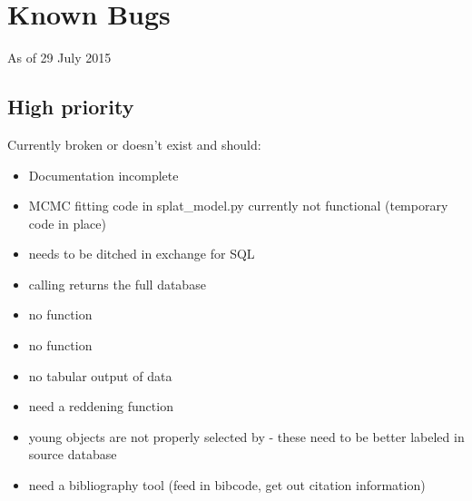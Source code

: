 \documentclass[letterpaper,10pt,english]{sphinxmanual}
\begin{document}
\section{Known Bugs}
\label{bugs:known-bugs}\label{bugs::doc}
As of 29 July 2015


\subsection{High priority}
\label{bugs:high-priority}
Currently broken or doesn't exist and should:
\begin{itemize}
\item {} 
Documentation incomplete

\item {} 
MCMC fitting code in splat\_model.py currently not functional (temporary code in place)

\item {} 
 needs to be ditched in exchange for SQL

\item {} 
calling  returns the full database

\item {} 
no  function

\item {} 
no  function

\item {} 
no tabular output of data

\item {} 
need a reddening function

\item {} 
young objects are not properly selected by  - these need to be better labeled in source database

\item {} 
need a bibliography tool (feed in bibcode, get out citation information)

\end{itemize}
\end{document}
